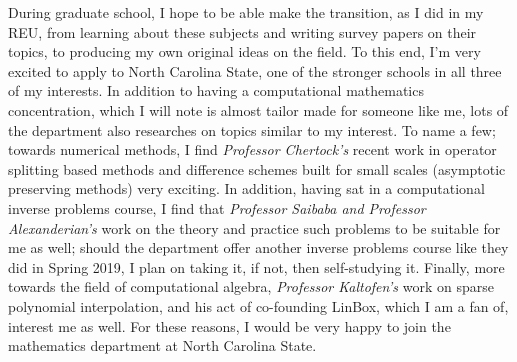 \documentclass[11pt]{article}
\begin{document}
During graduate school, I hope to be able make the transition, as I did in my
REU, from learning about these subjects and writing survey papers on their
topics, to producing my own original ideas on the field. To this end, I'm very
excited to apply to North Carolina State, one of the stronger schools in all
three of my interests. In addition to having a computational mathematics
concentration, which I will note is almost tailor made for someone like me, lots
of the department also researches on topics similar to my interest. To name
a few; towards numerical methods, I find {\em Professor Chertock's} recent work
in operator splitting based methods and difference schemes built for small
scales (asymptotic preserving methods) very exciting. In addition, having sat in
a computational inverse problems course, I find that {\em Professor Saibaba and
Professor Alexanderian's} work on the theory and practice such problems to be
suitable for me as well; should the department offer another inverse problems
course like they did in Spring 2019, I plan on taking it, if not, then
self-studying it. Finally, more towards the field of computational algebra, {\em
Professor Kaltofen's} work on sparse polynomial interpolation, and his act of
co-founding LinBox, which I am a fan of, interest me as well. For these reasons,
I would be very happy to join the mathematics department at North Carolina
State.
\end{document}
